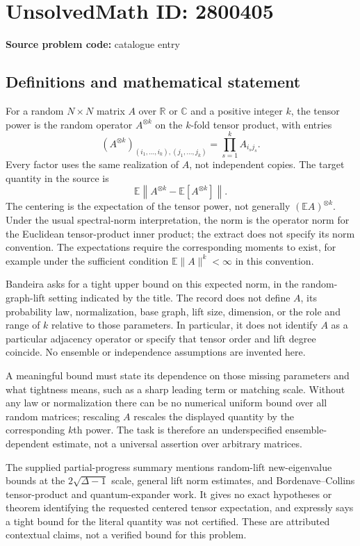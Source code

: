 \documentclass[11pt]{article}
\newcommand{\R}{\mathbb{R}}
\newcommand{\C}{\mathbb{C}}
\newcommand{\E}{\mathbb{E}}
\begin{document}
\section*{UnsolvedMath ID: 2800405}
\textbf{Source problem code:} catalogue entry
\subsection{Definitions and mathematical statement}
For a random $N\times N$ matrix $A$ over $\R$ or $\C$ and a positive integer $k$, the tensor power is the random operator $A^{\otimes k}$ on the $k$-fold tensor product, with entries
\[
(A^{\otimes k})_{(i_1,\ldots,i_k),(j_1,\ldots,j_k)}
=\prod_{s=1}^k A_{i_sj_s}.
\]
Every factor uses the same realization of $A$, not independent copies. The target quantity in the source is
\[
\E\left\|A^{\otimes k}-\E[A^{\otimes k}]\right\|.
\]
The centering is the expectation of the tensor power, not generally $(\E A)^{\otimes k}$. Under the usual spectral-norm interpretation, the norm is the operator norm for the Euclidean tensor-product inner product; the extract does not specify its norm convention. The expectations require the corresponding moments to exist, for example under the sufficient condition $\E\|A\|^k<\infty$ in this convention.

Bandeira asks for a tight upper bound on this expected norm, in the random-graph-lift setting indicated by the title. The record does not define $A$, its probability law, normalization, base graph, lift size, dimension, or the role and range of $k$ relative to those parameters. In particular, it does not identify $A$ as a particular adjacency operator or specify that tensor order and lift degree coincide. No ensemble or independence assumptions are invented here.

A meaningful bound must state its dependence on those missing parameters and what tightness means, such as a sharp leading term or matching scale. Without any law or normalization there can be no numerical uniform bound over all random matrices; rescaling $A$ rescales the displayed quantity by the corresponding $k$th power. The task is therefore an underspecified ensemble-dependent estimate, not a universal assertion over arbitrary matrices.

The supplied partial-progress summary mentions random-lift new-eigenvalue bounds at the $2\sqrt{\Delta-1}$ scale, general lift norm estimates, and Bordenave--Collins tensor-product and quantum-expander work. It gives no exact hypotheses or theorem identifying the requested centered tensor expectation, and expressly says a tight bound for the literal quantity was not certified. These are attributed contextual claims, not a verified bound for this problem.
\end{document}
